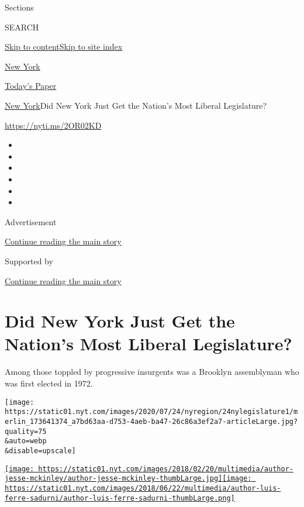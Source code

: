 Sections

SEARCH

\protect\hyperlink{site-content}{Skip to
content}\protect\hyperlink{site-index}{Skip to site index}

\href{https://www.nytimes.com/section/nyregion}{New York}

\href{https://myaccount.nytimes.com/auth/login?response_type=cookie\&client_id=vi}{}

\href{https://www.nytimes.com/section/todayspaper}{Today's Paper}

\href{/section/nyregion}{New York}\textbar{}Did New York Just Get the
Nation's Most Liberal Legislature?

\url{https://nyti.ms/2OR02KD}

\begin{itemize}
\item
\item
\item
\item
\item
\item
\end{itemize}

Advertisement

\protect\hyperlink{after-top}{Continue reading the main story}

Supported by

\protect\hyperlink{after-sponsor}{Continue reading the main story}

\hypertarget{did-new-york-just-get-the-nations-most-liberal-legislature}{%
\section{Did New York Just Get the Nation's Most Liberal
Legislature?}\label{did-new-york-just-get-the-nations-most-liberal-legislature}}

Among those toppled by progressive insurgents was a Brooklyn assemblyman
who was first elected in 1972.

\texttt{[image: https://static01.nyt.com/images/2020/07/24/nyregion/24nylegislature1/merlin\_173641374\_a7bd63aa-d753-4aeb-ba47-26c86a3ef2a7-articleLarge.jpg?quality=75\\\&auto=webp\\\&disable=upscale]}

\href{https://www.nytimes.com/by/jesse-mckinley}{\texttt{[image: https://static01.nyt.com/images/2018/02/20/multimedia/author-jesse-mckinley/author-jesse-mckinley-thumbLarge.jpg]}}\href{https://www.nytimes.com/by/luis-ferre-sadurni}{\texttt{[image: https://static01.nyt.com/images/2018/06/22/multimedia/author-luis-ferre-sadurni/author-luis-ferre-sadurni-thumbLarge.png]}}

